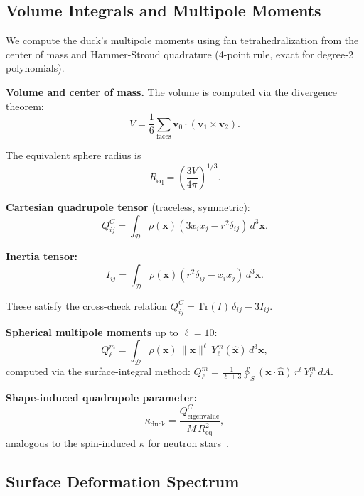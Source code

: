 \documentclass[aps,prd,twocolumn,superscriptaddress,nofootinbib]{revtex4-2}
\begin{document}
\subsection{Volume Integrals and Multipole Moments}
\label{sec:multipoles}

We compute the duck's multipole moments using fan tetrahedralization from
the center of mass and Hammer-Stroud quadrature (4-point rule, exact for
degree-2 polynomials).

\textbf{Volume and center of mass.}
The volume is computed via the divergence theorem:
\begin{equation}
V = \frac{1}{6}\sum_{\text{faces}} \mathbf{v}_0 \cdot (\mathbf{v}_1 \times
\mathbf{v}_2).
\end{equation}

The equivalent sphere radius is
\begin{equation}
R_{\mathrm{eq}} = \left(\frac{3V}{4\pi}\right)^{1/3}.
\end{equation}

\textbf{Cartesian quadrupole tensor} (traceless, symmetric):
\begin{equation}
Q^C_{ij} = \int_{\mathcal{D}} \rho(\mathbf{x})(3x_i x_j - r^2
\delta_{ij})\,d^3\mathbf{x}.
\end{equation}

\textbf{Inertia tensor:}
\begin{equation}
I_{ij} = \int_{\mathcal{D}} \rho(\mathbf{x})(r^2 \delta_{ij} - x_i
x_j)\,d^3\mathbf{x}.
\end{equation}

These satisfy the cross-check relation
$Q^C_{ij} = \mathrm{Tr}(I)\,\delta_{ij} - 3I_{ij}$.

\textbf{Spherical multipole moments} up to $\ell = 10$:
\begin{equation}
Q_\ell^m = \int_{\mathcal{D}} \rho(\mathbf{x})\,\|\mathbf{x}\|^\ell\,
Y_\ell^m(\hat{\mathbf{x}})\,d^3\mathbf{x},
\end{equation}
computed via the surface-integral method:
$Q_\ell^m = \frac{1}{\ell+3}\oint_S (\mathbf{x}\cdot\hat{\mathbf{n}})\,
r^\ell\,Y_\ell^m\,dA$.

\textbf{Shape-induced quadrupole parameter:}
\begin{equation}
\kappa_{\mathrm{duck}} = \frac{Q^C_{\mathrm{eigenvalue}}}{M\,R_{\mathrm{eq}}^2},
\end{equation}
analogous to the spin-induced $\kappa$ for neutron
stars~\cite{LaarakkersPoisson1999}.


\subsection{Surface Deformation Spectrum}
\label{sec:deformation}
\end{document}
